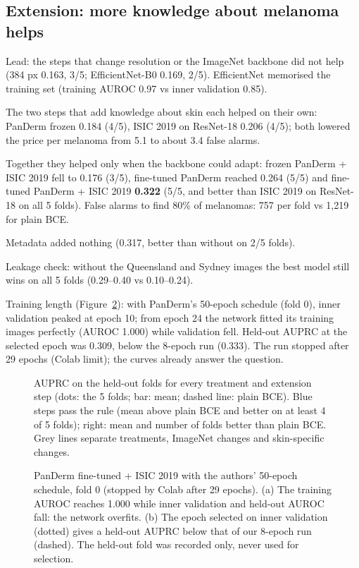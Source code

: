 \subsection{Extension: more knowledge about melanoma helps}
\begin{notes}
  \item Lead: the steps that change resolution or the ImageNet backbone did not help (384 px 0.163, 3/5; EfficientNet-B0 0.169, 2/5). EfficientNet memorised the training set (training AUROC 0.97 vs inner validation 0.85).
  \item The two steps that add knowledge about skin each helped on their own: PanDerm frozen 0.184 (4/5), ISIC 2019 on ResNet-18 0.206 (4/5); both lowered the price per melanoma from 5.1 to about 3.4 false alarms.
  \item Together they helped only when the backbone could adapt: frozen PanDerm + ISIC 2019 fell to 0.176 (3/5), fine-tuned PanDerm reached 0.264 (5/5) and fine-tuned PanDerm + ISIC 2019 \textbf{0.322} (5/5, and better than ISIC 2019 on ResNet-18 on all 5 folds). False alarms to find 80\% of melanomas: 757 per fold vs 1,219 for plain BCE.
  \item Metadata added nothing (0.317, better than without on 2/5 folds).
  \item Leakage check: without the Queensland and Sydney images the best model still wins on all 5 folds (0.29--0.40 vs 0.10--0.24).
  \item Training length (Figure~\ref{fig:long}): with PanDerm's 50-epoch schedule (fold 0), inner validation peaked at epoch 10; from epoch 24 the network fitted its training images perfectly (AUROC 1.000) while validation fell. Held-out AUPRC at the selected epoch was 0.309, below the 8-epoch run (0.333). The run stopped after 29 epochs (Colab limit); the curves already answer the question.
\end{notes}

\begin{figure}[t]
\centering
{}
\caption{AUPRC on the held-out folds for every treatment and extension step (dots: the 5 folds; bar: mean; dashed line: plain BCE). Blue steps pass the rule (mean above plain BCE and better on at least 4 of 5 folds); right: mean and number of folds better than plain BCE. Grey lines separate treatments, ImageNet changes and skin-specific changes.}
\label{fig:steps}
\end{figure}

\begin{figure}[t]
\centering
{}
\caption{PanDerm fine-tuned + ISIC 2019 with the authors' 50-epoch schedule, fold 0 (stopped by Colab after 29 epochs). (a) The training AUROC reaches 1.000 while inner validation and held-out AUROC fall: the network overfits. (b) The epoch selected on inner validation (dotted) gives a held-out AUPRC below that of our 8-epoch run (dashed). The held-out fold was recorded only, never used for selection.}
\label{fig:long}
\end{figure}

